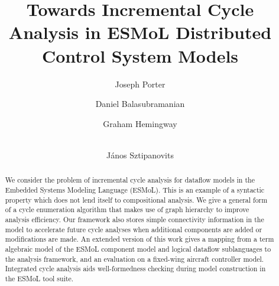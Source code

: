 \documentclass{llncs}
\begin{document}
%
%
\ifx\techreport\undefined
\pagestyle{headings}  %
%
%
\mainmatter              %
\fi
%
\title{Towards Incremental Cycle Analysis in ESMoL Distributed Control System
Models}
%
\ifx\techreport\undefined
{}  %
%
\author{Joseph Porter \and Daniel Balasubramanian \and Graham Hemingway \and \\  J\'{a}nos Sztipanovits}
%
%
%
\fi

\ifx\techreport\undefined
\else

\fi

\ifx\techreport\undefined
\maketitle %
\fi


\begin{abstract}
We consider the problem of incremental cycle analysis for dataflow models in 
the Embedded Systems Modeling Language (ESMoL).  This is an example of a syntactic property which does not lend itself to compositional analysis. We give a general form of a cycle enumeration algorithm that makes use of graph hierarchy to improve analysis efficiency.  Our framework also stores simple connectivity information in the model to accelerate future cycle analyses when additional components are added or modifications are made.  An extended version of this work gives a mapping from a term algebraic model of the ESMoL component model and logical dataflow sublanguages to the analysis framework, and an evaluation on a fixed-wing aircraft controller model\cite{modeling:esmol_cycles_tr}.  Integrated cycle analysis aids well-formedness checking during model construction in the ESMoL tool suite.
\ifx\techreport\undefined
{}
\fi
\end{abstract}
%
\end{document}
